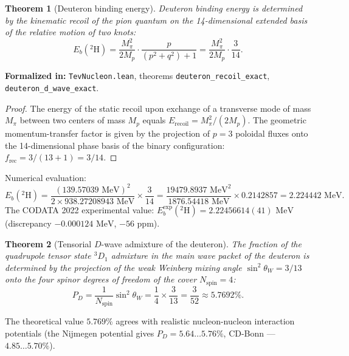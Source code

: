 \documentclass[11pt,a4paper]{article}
\newtheorem{theorem}{Theorem}
\theoremstyle{definition}
\theoremstyle{remark}
\begin{document}
\begin{theorem}[Deuteron binding energy]
\label{thm:deuteron_binding}
	Deuteron binding energy is determined by the kinematic recoil of the pion quantum on the 14-dimensional extended basis of the relative motion of two knots:
\begin{equation}
	E_b(^2\mathrm{H}) = \frac{M_\pi^2}{2 M_p} \cdot \frac{p}{(p^2 + q^2) + 1} = \frac{M_\pi^2}{2 M_p} \cdot \frac{3}{14}.
\label{eq:deuteron_binding_exact}
\end{equation}
\end{theorem}

\noindent\small\textbf{Formalized in:} \texttt{TevNucleon.lean}, theorems \texttt{deuteron_recoil_exact}, \texttt{deuteron_d_wave_exact}.

\begin{proof}
	The energy of the static recoil upon exchange of a transverse mode of mass $M_\pi$ between two centers of mass $M_p$ equals $E_{\mathrm{recoil}} = M_\pi^2 / (2 M_p)$. The geometric momentum-transfer factor is given by the projection of $p=3$ poloidal fluxes onto the 14-dimensional phase basis of the binary configuration: $f_{\mathrm{rec}} = 3 / (13 + 1) = 3/14$.
\end{proof}

Numerical evaluation:
\begin{equation}
	E_b(^2\mathrm{H}) = \frac{(139.57039\text{ MeV})^2}{2 \times 938.27208943\text{ MeV}} \times \frac{3}{14} = \frac{19479.8937\text{ MeV}^2}{1876.54418\text{ MeV}} \times 0.2142857 = 2.224442\text{ MeV}.
	\label{eq:deuteron_binding_numerical}
\end{equation}
The CODATA 2022 experimental value: $E_b^{\mathrm{exp}}(^2\mathrm{H}) = 2.22456614(41)\text{ MeV}$ (discrepancy $-0.000124\text{ MeV}$, $-56\text{ ppm}$).

\begin{theorem}[Tensorial $D$-wave admixture of the deuteron]
\label{thm:deuteron_d_wave}
	The fraction of the quadrupole tensor state $^3D_1$ admixture in the main wave packet of the deuteron is determined by the projection of the weak Weinberg mixing angle $\sin^2\theta_W = 3/13$ onto the four spinor degrees of freedom of the cover $N_{\mathrm{spin}} = 4$:
\begin{equation}
	P_D = \frac{1}{N_{\mathrm{spin}}} \sin^2\theta_W = \frac{1}{4} \times \frac{3}{13} = \frac{3}{52} \approx 5.7692\%.
\label{eq:deuteron_d_wave_formula}
\end{equation}
\end{theorem}
The theoretical value $5.769\%$ agrees with realistic nucleon-nucleon interaction potentials (the Nijmegen potential gives $P_D = 5.64\dots 5.76\%$, CD-Bonn — $4.85\dots 5.70\%$).
\end{document}
